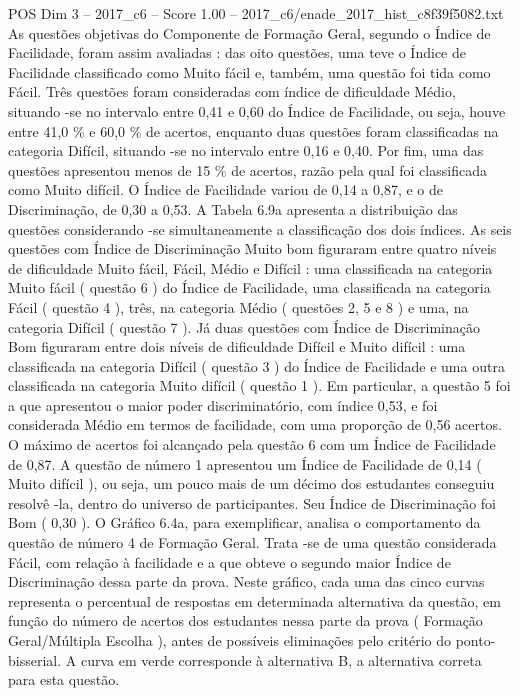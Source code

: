 \begin{textsample}{POS Dim 3 – 2017\_c6 – Score 1.00 – 2017\_c6/enade\_2017\_hist\_c8f39f5082.txt}
As questões objetivas do Componente de Formação Geral, segundo o Índice de Facilidade, foram assim avaliadas : das oito questões, uma teve o Índice de Facilidade classificado como Muito fácil e, também, uma questão foi tida como Fácil.
Três questões foram consideradas com índice de dificuldade Médio, situando -se no intervalo entre 0,41 e 0,60 do Índice de Facilidade, ou seja, houve entre 41,0 \% e 60,0 \% de acertos, enquanto duas questões foram classificadas na categoria Difícil, situando -se no intervalo entre 0,16 e 0,40.
Por fim, uma das questões apresentou menos de 15 \% de acertos, razão pela qual foi classificada como Muito difícil.
O Índice de Facilidade variou de 0,14 a 0,87, e o de Discriminação, de 0,30 a 0,53.
A Tabela 6.9a apresenta a distribuição das questões considerando -se simultaneamente a classificação dos dois índices.
As seis questões com Índice de Discriminação Muito bom figuraram entre quatro níveis de dificuldade Muito fácil, Fácil, Médio e Difícil : uma classificada na categoria Muito fácil ( questão 6 ) do Índice de Facilidade, uma classificada na categoria Fácil ( questão 4 ), três, na categoria Médio ( questões 2, 5 e 8 ) e uma, na categoria Difícil ( questão 7 ).
Já duas questões com Índice de Discriminação Bom figuraram entre dois níveis de dificuldade Difícil e Muito difícil : uma classificada na categoria Difícil ( questão 3 ) do Índice de Facilidade e uma outra classificada na categoria Muito difícil ( questão 1 ).
Em particular, a questão 5 foi a que apresentou o maior poder discriminatório, com índice 0,53, e foi considerada Médio em termos de facilidade, com uma proporção de 0,56 acertos.
O máximo de acertos foi alcançado pela questão 6 com um Índice de Facilidade de 0,87.
A questão de número 1 apresentou um Índice de Facilidade de 0,14 ( Muito difícil ), ou seja, um pouco mais de um décimo dos estudantes conseguiu resolvê -la, dentro do universo de participantes.
Seu Índice de Discriminação foi Bom ( 0,30 ).
O Gráfico 6.4a, para exemplificar, analisa o comportamento da questão de número 4 de Formação Geral.
Trata -se de uma questão considerada Fácil, com relação à facilidade e a que obteve o segundo maior Índice de Discriminação dessa parte da prova.
Neste gráfico, cada uma das cinco curvas representa o percentual de respostas em determinada alternativa da questão, em função do número de acertos dos estudantes nessa parte da prova ( Formação Geral/Múltipla Escolha ), antes de possíveis eliminações pelo critério do ponto-bisserial.
A curva em verde corresponde à alternativa B, a alternativa correta para esta questão.

\end{textsample}
